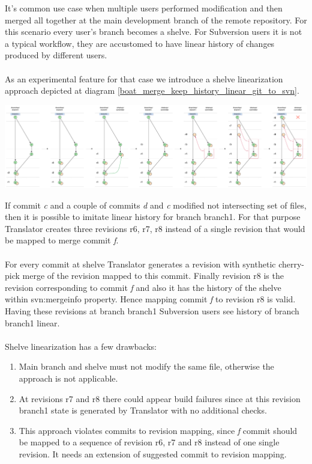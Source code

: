 It's common use case when multiple users performed modification and then merged all together at the main development branch of the remote repository. For this scenario every user's branch becomes a shelve. For Subversion users it is not a typical workflow, they are accustomed to have linear history of changes produced by different users.
\\\\
As an experimental feature for that case we introduce a shelve linearization approach depicted at diagram \ref{boat_merge_keep_history_linear_git_to_svn}.
\begin{center}
\includegraphics[width=\textwidth]{img/diagrams/boat_merge_keep_history_linear_git_to_svn.pdf}%
\label{boat_merge_keep_history_linear_git_to_svn}%
\end{center}

If commit \emph{c} and a couple of commits \emph{d} and \emph{c} modified not intersecting set of files, then it is possible to imitate linear history for branch branch1. For that purpose Translator creates three revisions r6, r7, r8 instead of a single revision that would be mapped to merge commit \emph{f}.
\\\\
For every commit at shelve Translator generates a revision with synthetic cherry-pick merge of the revision mapped to this commit. Finally revision r8 is the revision corresponding to commit \emph{f} and also it has the history of the shelve within svn:mergeinfo property. Hence mapping commit \emph{f} to revision r8 is valid. Having these revisions at branch branch1 Subversion users see history of branch branch1 linear.
\\\\
Shelve linearization has a few drawbacks:
\begin{enumerate}
\compactlist
	\item Main branch and shelve must not modify the same file, otherwise the approach is not applicable.
	\item At revisions r7 and r8 there could appear build failures since at this revision branch1 state is generated by Translator with no additional checks.
	\item This approach violates commits to revision mapping, since \emph{f} commit should be mapped to a sequence of revision r6, r7 and r8 instead of one single revision. It needs an extension of suggested commit to revision mapping.
\end{enumerate}

